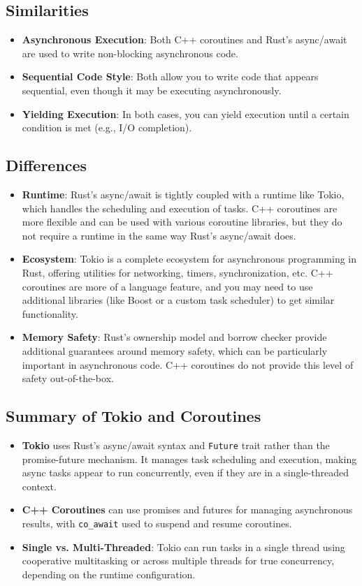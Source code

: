 \documentclass{article}
\begin{document}
\subsection{Similarities}
\begin{itemize}
    \item \textbf{Asynchronous Execution}: Both C++ coroutines and Rust’s async/await are used to write non-blocking asynchronous code.
    \item \textbf{Sequential Code Style}: Both allow you to write code that appears sequential, even though it may be executing asynchronously.
    \item \textbf{Yielding Execution}: In both cases, you can yield execution until a certain condition is met (e.g., I/O completion).
\end{itemize}

\subsection{Differences}
\begin{itemize}
    \item \textbf{Runtime}: Rust's async/await is tightly coupled with a runtime like Tokio, which handles the scheduling and execution of tasks. C++ coroutines are more flexible and can be used with various coroutine libraries, but they do not require a runtime in the same way Rust’s async/await does.
    \item \textbf{Ecosystem}: Tokio is a complete ecosystem for asynchronous programming in Rust, offering utilities for networking, timers, synchronization, etc. C++ coroutines are more of a language feature, and you may need to use additional libraries (like Boost or a custom task scheduler) to get similar functionality.
    \item \textbf{Memory Safety}: Rust's ownership model and borrow checker provide additional guarantees around memory safety, which can be particularly important in asynchronous code. C++ coroutines do not provide this level of safety out-of-the-box.
\end{itemize}

\subsection{Summary of Tokio and Coroutines}
\begin{itemize}
    \item \textbf{Tokio} uses Rust's async/await syntax and \texttt{Future} trait rather than the promise-future mechanism. It manages task scheduling and execution, making async tasks appear to run concurrently, even if they are in a single-threaded context.
    \item \textbf{C++ Coroutines} can use promises and futures for managing asynchronous results, with \texttt{co\_await} used to suspend and resume coroutines.
    \item \textbf{Single vs. Multi-Threaded}: Tokio can run tasks in a single thread using cooperative multitasking or across multiple threads for true concurrency, depending on the runtime configuration.
\end{itemize}
\end{document}
